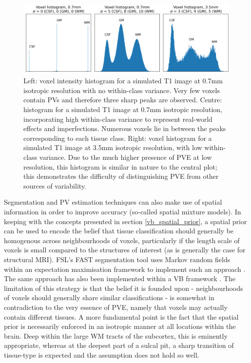 \documentclass[12pt]{report}
\begin{document}
\begin{figure}
\centering
\includegraphics[width = \textwidth]{ideal_imperfect_pve_hists.png}
\caption{Left: voxel intensity histogram for a simulated T1 image at 0.7mm isotropic resolution with no within-class variance. Very few voxels contain PVs and therefore three sharp peaks are observed. Centre: histogram for a simulated T1 image at 0.7mm isotropic resolution, incorporating high within-class variance to represent real-world effects and imperfections. Numerous voxels lie in between the peaks corresponding to each tissue class. Right: voxel histogram for a simulated T1 image at 3.5mm isotropic resolution, with low within-class variance. Due to the much higher presence of PVE at low resolution, this histogram is similar in nature to the central plot; this demonstrates the difficulty of distinguishing PVE from other sources of variability.}
\label{ideal_imperfect_pve_hists}
\end{figure}

Segmentation and PV estimation techniques can also make use of spatial information in order to improve accuracy (so-called spatial mixture models). In keeping with the concepts presented in section \ref{vb_spatial_prior}, a spatial prior can be used to encode the belief that tissue classification should generally be homogenous across neighbourhoods of voxels, particularly if the length scale of voxels is small compared to the structures of interest (as is generally the case for structural MRI). FSL's FAST segmentation tool uses Markov random fields within an expectation maximisation framework to implement such an approach \cite{Zhang2001}. The same approach has also been implemented within a VB framework \cite{Woolrich2006}. The limitation of this strategy is that the belief it is founded upon - neighbourhoods of voxels should generally share similar classifications - is somewhat in contradiction to the very essence of PVE, namely that voxels may actually contain different tissues. A more fundamental point is the fact that the spatial prior is necessarily enforced in an isotropic manner at all locations within the brain. Deep within the large WM tracts of the subcortex, this is eminently appropriate, whereas at the deepest part of a sulcal pit, a sharp transition of tissue-type is expected and the assumption does not hold so well. 
\end{document}
